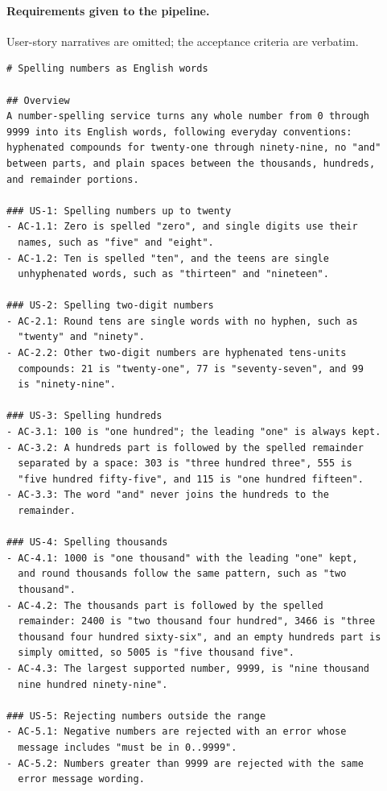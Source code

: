 \paragraph{Requirements given to the pipeline.} User-story narratives are omitted; the acceptance
criteria are verbatim.
\begin{small}
\begin{Verbatim}[breaklines,breakanywhere]
# Spelling numbers as English words

## Overview
A number-spelling service turns any whole number from 0 through
9999 into its English words, following everyday conventions:
hyphenated compounds for twenty-one through ninety-nine, no "and"
between parts, and plain spaces between the thousands, hundreds,
and remainder portions.

### US-1: Spelling numbers up to twenty
- AC-1.1: Zero is spelled "zero", and single digits use their
  names, such as "five" and "eight".
- AC-1.2: Ten is spelled "ten", and the teens are single
  unhyphenated words, such as "thirteen" and "nineteen".

### US-2: Spelling two-digit numbers
- AC-2.1: Round tens are single words with no hyphen, such as
  "twenty" and "ninety".
- AC-2.2: Other two-digit numbers are hyphenated tens-units
  compounds: 21 is "twenty-one", 77 is "seventy-seven", and 99
  is "ninety-nine".

### US-3: Spelling hundreds
- AC-3.1: 100 is "one hundred"; the leading "one" is always kept.
- AC-3.2: A hundreds part is followed by the spelled remainder
  separated by a space: 303 is "three hundred three", 555 is
  "five hundred fifty-five", and 115 is "one hundred fifteen".
- AC-3.3: The word "and" never joins the hundreds to the
  remainder.

### US-4: Spelling thousands
- AC-4.1: 1000 is "one thousand" with the leading "one" kept,
  and round thousands follow the same pattern, such as "two
  thousand".
- AC-4.2: The thousands part is followed by the spelled
  remainder: 2400 is "two thousand four hundred", 3466 is "three
  thousand four hundred sixty-six", and an empty hundreds part is
  simply omitted, so 5005 is "five thousand five".
- AC-4.3: The largest supported number, 9999, is "nine thousand
  nine hundred ninety-nine".

### US-5: Rejecting numbers outside the range
- AC-5.1: Negative numbers are rejected with an error whose
  message includes "must be in 0..9999".
- AC-5.2: Numbers greater than 9999 are rejected with the same
  error message wording.
\end{Verbatim}
\end{small}

